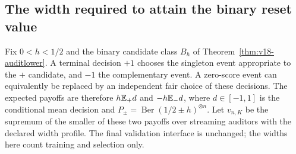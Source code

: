 \subsection{The width required to attain the binary reset value}
Fix $0<h<1/2$ and the binary candidate class $B_h$ of
Theorem~\ref{thm:v18-auditlower}. A terminal decision $+1$ chooses the
singleton event appropriate to the $+$ candidate, and $-1$ the complementary
event. A zero-score event can equivalently be replaced by an independent
fair choice of these decisions. The expected payoffs are therefore
$h\mathbb E_+d$ and $-h\mathbb E_-d$, where $d\in[-1,1]$ is the conditional mean
decision and $P_\pm=\operatorname{Ber}(1/2\pm h)^{\otimes n}$.
Let $v_{n,K}$ be the supremum of the smaller of these two payoffs over
streaming auditors with the declared width profile. The final validation
interface is unchanged; the widths here count training and selection only.

